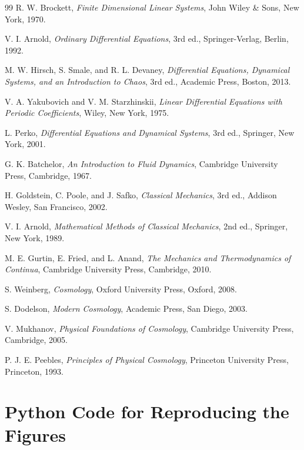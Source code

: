 \documentclass[11pt,a4paper]{article}
\theoremstyle{definition}
\numberwithin{equation}{section}
\begin{document}
\begin{thebibliography}{99}
R. W. Brockett,
\textit{Finite Dimensional Linear Systems},
John Wiley \& Sons, New York, 1970.

V. I. Arnold,
\textit{Ordinary Differential Equations}, 3rd ed.,
Springer-Verlag, Berlin, 1992.

M. W. Hirsch, S. Smale, and R. L. Devaney,
\textit{Differential Equations, Dynamical Systems, and an Introduction to Chaos}, 3rd ed.,
Academic Press, Boston, 2013.

V. A. Yakubovich and V. M. Starzhinskii,
\textit{Linear Differential Equations with Periodic Coefficients},
Wiley, New York, 1975.

L. Perko,
\textit{Differential Equations and Dynamical Systems}, 3rd ed.,
Springer, New York, 2001.

G. K. Batchelor,
\textit{An Introduction to Fluid Dynamics},
Cambridge University Press, Cambridge, 1967.


H. Goldstein, C. Poole, and J. Safko,
\textit{Classical Mechanics}, 3rd ed.,
Addison Wesley, San Francisco, 2002.

V. I. Arnold,
\textit{Mathematical Methods of Classical Mechanics}, 2nd ed.,
Springer, New York, 1989.

M. E. Gurtin, E. Fried, and L. Anand,
\textit{The Mechanics and Thermodynamics of Continua},
Cambridge University Press, Cambridge, 2010.

S. Weinberg,
\textit{Cosmology},
Oxford University Press, Oxford, 2008.

S. Dodelson,
\textit{Modern Cosmology},
Academic Press, San Diego, 2003.

V. Mukhanov,
\textit{Physical Foundations of Cosmology},
Cambridge University Press, Cambridge, 2005.

P. J. E. Peebles,
\textit{Principles of Physical Cosmology},
Princeton University Press, Princeton, 1993.

\end{thebibliography}
\endgroup

\clearpage
\appendix
\section{Python Code for Reproducing the Figures}
\label{app:python-code}
\end{document}
